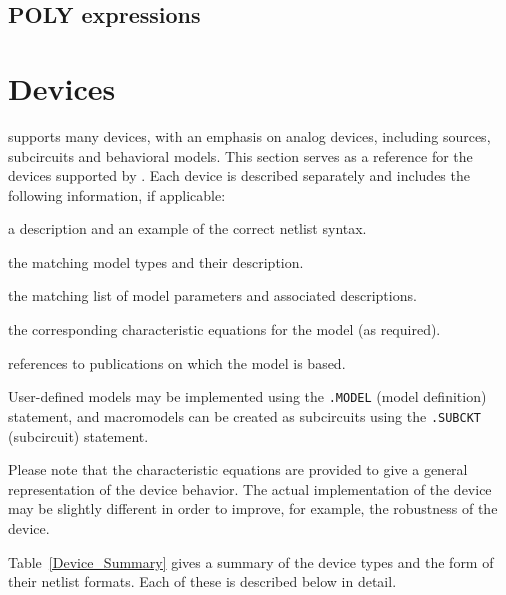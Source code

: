 \subsection{POLY expressions}
\label{PspicePoly}




\newpage
\section{Devices}
\label{Analog_Devices}

\Xyce{} supports many devices, with an emphasis on analog devices, including
sources, subcircuits and behavioral models.  This section serves as a reference
for the devices supported by \Xyce{}.  Each device is described separately and
includes the following information, if applicable:
\begin{XyceItemize}
\item a description and an example of the correct netlist syntax.
\item the matching model types and their description.
\item the matching list of model parameters and associated descriptions.
\item the corresponding
 characteristic equations for the model (as required).
\item references to publications on which the model is based.
\end{XyceItemize}
User-defined models may be implemented using the  \texttt{.MODEL} (model definition)
statement, and macromodels can be created as subcircuits using the
 \texttt{.SUBCKT}
(subcircuit) statement.

Please note that the characteristic equations are
provided to give a general representation of the device behavior.  The actual
\Xyce{} implementation of the device may be slightly different in order to
improve, for example, the robustness of the device.

Table~\ref{Device_Summary} gives a summary of the device types and the form of
their netlist formats.  Each of these is described below in detail.

